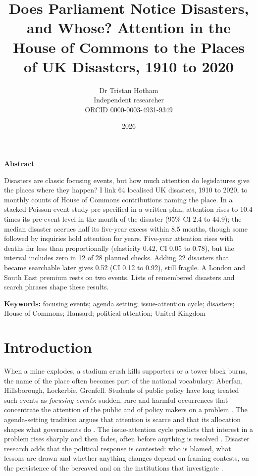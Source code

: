 \documentclass[11pt,a4paper]{article}
\title{\textbf{Does Parliament Notice Disasters, and Whose? Attention in the House of Commons to the Places of UK Disasters, 1910 to 2020}}
\author{Dr Tristan Hotham\\\small Independent researcher\\\small ORCID 0000-0003-4931-9349}
\date{2026}
\begin{document}
\maketitle
\begin{center}\textbf{Abstract}\end{center}
Disasters are classic focusing events, but how much attention do legislatures give the places where they happen? I link 64 localised UK disasters, 1910 to 2020, to monthly counts of House of Commons contributions naming the place. In a stacked Poisson event study pre-specified in a written plan, attention rises to 10.4 times its pre-event level in the month of the disaster (95\% CI 2.4 to 44.9); the median disaster accrues half its five-year excess within 8.5 months, though some followed by inquiries hold attention for years. Five-year attention rises with deaths far less than proportionally (elasticity 0.42, CI 0.05 to 0.78), but the interval includes zero in 12 of 28 planned checks. Adding 22 disasters that became searchable later gives 0.52 (CI 0.12 to 0.92), still fragile. A London and South East premium rests on two events. Lists of remembered disasters and search phrases shape these results.

\medskip\noindent\textbf{Keywords:} focusing events; agenda setting; issue-attention cycle; disasters; House of Commons; Hansard; political attention; United Kingdom

\section{Introduction}
\label{sec:intro}
When a mine explodes, a stadium crush kills supporters or a tower block burns, the name of the place often becomes part of the national vocabulary: Aberfan, Hillsborough, Lockerbie, Grenfell. Students of public policy have long treated such events as \emph{focusing events}: sudden, rare and harmful occurrences that concentrate the attention of the public and of policy makers on a problem \citep{Kingdon1984,Birkland1997,Birkland1998}. The agenda-setting tradition argues that attention is scarce and that its allocation shapes what governments do \citep{BaumgartnerJones1993,JonesBaumgartner2005}. The issue-attention cycle predicts that interest in a problem rises sharply and then fades, often before anything is resolved \citep{Downs1972}. Disaster research adds that the political response is contested: who is blamed, what lessons are drawn and whether anything changes depend on framing contests, on the persistence of the bereaved and on the institutions that investigate \citep{Boin2005,Boin2009,Hood2011,Birkland2006}.
\end{document}

